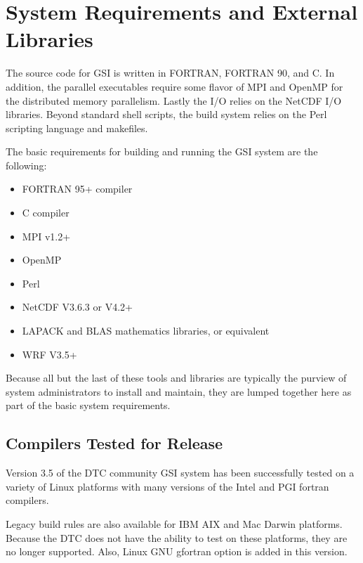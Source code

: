 \section{System Requirements and External Libraries}  \label{ch2_externallibs}

The source code for GSI is written in FORTRAN, FORTRAN 90, and C. In addition, the parallel executables require some flavor of MPI and OpenMP for the distributed memory parallelism. Lastly the I/O relies on the NetCDF I/O libraries. Beyond standard shell scripts, the build system relies on the Perl scripting language and makefiles.

The basic requirements for building and running the GSI system are the following:
\begin{itemize}
\item FORTRAN 95+ compiler 
\item C compiler
\item MPI v1.2+
\item OpenMP
\item Perl
\item NetCDF V3.6.3 or V4.2+
\item LAPACK and BLAS mathematics libraries, or equivalent 
\item WRF V3.5+
\end{itemize}

Because all but the last of these tools and libraries are typically the purview of system administrators to install and maintain, they are lumped together here as part of the basic system requirements.

\subsection{Compilers Tested for Release}

Version 3.5 of the DTC community GSI system has been successfully tested on a variety of Linux platforms with many versions of the Intel and PGI fortran compilers.

Legacy build rules are also available for IBM AIX and Mac Darwin platforms. Because the DTC does not have the ability to test on these platforms, they are no longer supported. Also, Linux GNU gfortran option is added in this version.

